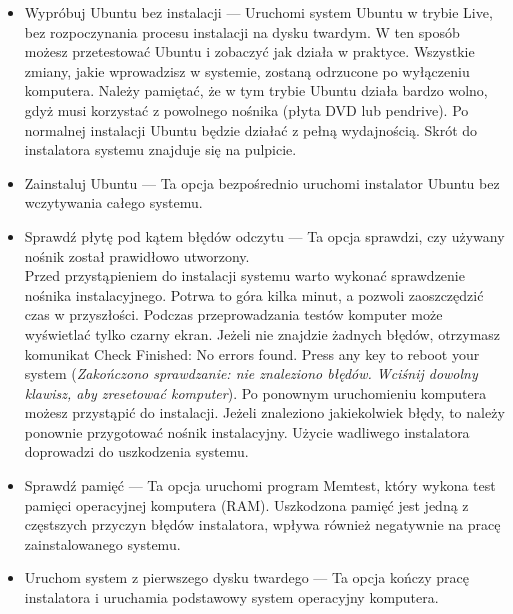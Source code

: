 \begin{itemize}
\item \textcolor{ubuntu_orange}{Wypróbuj Ubuntu bez instalacji} --- Uruchomi system Ubuntu w trybie Live, bez rozpoczynania procesu instalacji na dysku twardym. W ten sposób możesz przetestować Ubuntu i zobaczyć jak działa w praktyce. Wszystkie zmiany, jakie wprowadzisz w systemie, zostaną odrzucone po wyłączeniu komputera. Należy pamiętać, że w tym trybie Ubuntu działa bardzo wolno, gdyż musi korzystać z powolnego nośnika (płyta DVD lub pendrive). Po normalnej instalacji Ubuntu będzie działać z pełną wydajnością. Skrót do instalatora systemu znajduje się na pulpicie.
\item \textcolor{ubuntu_orange}{Zainstaluj Ubuntu} --- Ta opcja bezpośrednio uruchomi instalator Ubuntu bez wczytywania całego systemu.
\item \textcolor{ubuntu_orange}{Sprawdź płytę pod kątem błędów odczytu} --- Ta opcja sprawdzi, czy używany nośnik został prawidłowo utworzony.\\
Przed przystąpieniem do instalacji systemu warto wykonać sprawdzenie nośnika instalacyjnego. Potrwa to góra kilka minut, a pozwoli zaoszczędzić czas w przyszłości. Podczas przeprowadzania testów komputer może wyświetlać tylko czarny ekran. Jeżeli nie znajdzie żadnych błędów, otrzymasz komunikat \textcolor{ubuntu_orange}{Check Finished: No errors found. Press any key to reboot your system} (\textit{Zakończono sprawdzanie: nie znaleziono błędów. Wciśnij dowolny klawisz, aby zresetować komputer}). Po ponownym uruchomieniu komputera możesz przystąpić do instalacji. Jeżeli znaleziono jakiekolwiek błędy, to należy ponownie przygotować nośnik instalacyjny. Użycie wadliwego instalatora doprowadzi do uszkodzenia systemu. 
\item \textcolor{ubuntu_orange}{Sprawdź pamięć} --- Ta opcja uruchomi program Memtest, który wykona test pamięci operacyjnej komputera (RAM). Uszkodzona pamięć jest jedną z częstszych przyczyn błędów instalatora, wpływa również negatywnie na pracę zainstalowanego systemu.
\item \textcolor{ubuntu_orange}{Uruchom system z pierwszego dysku twardego} --- Ta opcja kończy pracę instalatora i uruchamia podstawowy system operacyjny komputera.
\end{itemize}

